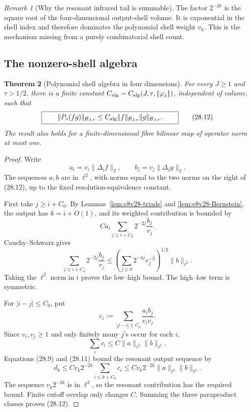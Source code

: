 \documentclass[11pt,oneside]{book}
\newtheorem{theorem}{Theorem}[chapter]
\theoremstyle{definition}
\theoremstyle{remark}
\newtheorem{remark}[theorem]{Remark}
\begin{document}
\begin{remark}[Why the resonant infrared tail is summable]
\label{rem:e8v28-resonant-gain}
The factor \(2^{-2k}\) is the square root of the four-dimensional
output-shell volume.  It is exponential in the shell index and
therefore dominates the polynomial shell weight \(v_k\).  This is the
mechanism missing from a purely combinatorial shell count.
\end{remark}

\subsection{The nonzero-shell algebra}

\begin{theorem}[Polynomial shell algebra in four dimensions]
\label{thm:e8v28-shell-algebra}
For every \(J\geq1\) and \(\tau>1/2\), there is a finite constant
\(C_{\rm alg}=C_{\rm alg}(J,\tau,\{\varphi_j\})\), independent of
volume, such that
\[
\boxed{\qquad
 \|P_\circ(fg)\|_{\mathcal B_{J,\tau}}
 \leq C_{\rm alg}
 \|f\|_{\mathcal B_{J,\tau}}
 \|g\|_{\mathcal B_{J,\tau}}.
\qquad}                                                           \tag{28.12}
\]
The result also holds for a finite-dimensional fibre bilinear map of
operator norm at most one.
\end{theorem}

\begin{proof}
Write
\[
 a_i=v_i\|\Delta_if\|_2,\qquad
 b_j=v_j\|\Delta_jg\|_2.                                         \tag{28.13}
\]
The sequences \(a,b\) are in \(\ell^2\), with norms equal to the two
norms on the right of (28.12), up to the fixed resolution-equivalence
constant.

First take \(j\geq i+C_0\).  By
Lemmas~\ref{lem:e8v28-triads} and
\ref{lem:e8v28-Bernstein}, the output has \(k=i+O(1)\), and its
weighted contribution is bounded by
\[
 C a_i\sum_{j\geq i+C_0}
       2^{-2j}\frac{b_j}{v_j}.                                   \tag{28.14}
\]
Cauchy--Schwarz gives
\[
 \sum_{j\geq i+C_0}2^{-2j}\frac{b_j}{v_j}
 \leq
 \left(\sum_{j\geq0}2^{-4j}v_j^{-2}\right)^{1/2}
 \|b\|_{\ell^2}.                                                  \tag{28.15}
\]
Taking the \(\ell^2\) norm in \(i\) proves the low--high bound.
The high--low term is symmetric.

For \(|i-j|\leq C_0\), put
\[
 c_i:=\sum_{|j-i|\leq C_0}
       \frac{a_i b_j}{v_i v_j}.                                  \tag{28.16}
\]
Since \(v_i,v_j\geq1\) and only finitely many \(j\)'s occur for each
\(i\),
\[
                         \sum_i c_i
 \leq C\|a\|_{\ell^2}\|b\|_{\ell^2}.                              \tag{28.17}
\]
Equations (28.9) and (28.11) bound the resonant output sequence by
\[
 d_k\leq
 C v_k2^{-2k}\sum_{i\leq k+C_0}c_i
 \leq
 C v_k2^{-2k}\|a\|_{\ell^2}\|b\|_{\ell^2}.                        \tag{28.18}
\]
The sequence \(v_k2^{-2k}\) is in \(\ell^2\), so the resonant
contribution has the required bound.  Finite cutoff overlap only
changes \(C\).  Summing the three paraproduct classes proves
(28.12).
\end{proof}
\end{document}
